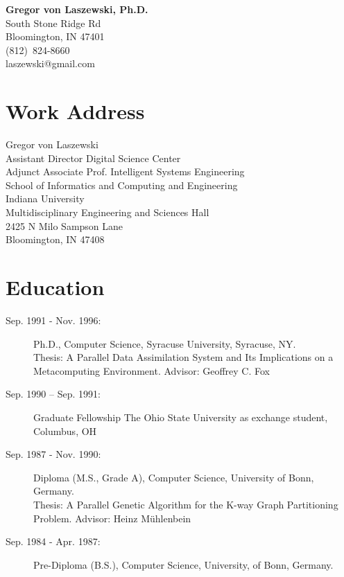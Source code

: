 \documentclass{article}
\begin{document}
\setcounter{varseg}{0}

\begin{center}
{\huge\bf Gregor von Laszewski, Ph.D.} \\
 South Stone Ridge Rd\\
Bloomington, IN 47401\\
(812)~824-8660\\
laszewski@gmail.com\\
\end{center}


\section{Work Address}

Gregor von Laszewski\\
Assistant Director Digital Science Center\\
Adjunct Associate Prof. Intelligent Systems Engineering\\


School of Informatics and Computing and Engineering\\
Indiana University\\
Multidisciplinary Engineering and Sciences Hall\\
2425 N Milo Sampson Lane\\
Bloomington, IN  47408\\



\section{Education}

\begin{description}
\item[Sep. 1991 - Nov. 1996:]        Ph.D., Computer Science, Syracuse University, Syracuse, NY. \\ 
    			      Thesis: A Parallel Data Assimilation System and Its Implications   
    				on a Metacomputing Environment. Advisor: Geoffrey C. Fox 

\item[Sep. 1990 – Sep. 1991:] 	Graduate Fellowship The Ohio State University as exchange student,
 				Columbus, OH 

\item[Sep. 1987 - Nov. 1990:]   	Diploma (M.S., Grade A), Computer Science, University of Bonn, Germany.\\ 
   				Thesis: A Parallel Genetic Algorithm for the K-way Graph Partitioning   
     				Problem.  Advisor: Heinz Mühlenbein 

\item[Sep. 1984 - Apr. 1987:]   Pre-Diploma (B.S.), Computer Science, University, of Bonn, Germany. 

\end{description}
 
\end{document}
